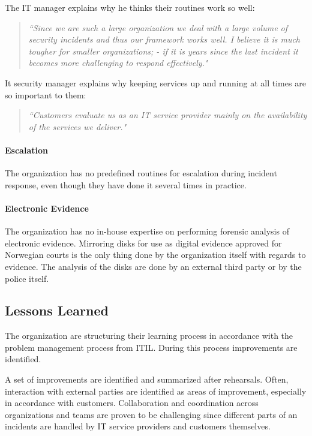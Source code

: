 The IT manager explains why he thinks their routines work so well:
\begin{quote}
\textit{``Since we are such a large organization we deal with a large volume of security incidents and thus our framework works well. I believe it is much tougher for smaller organizations; - if it is years since the last incident it becomes more challenging to respond effectively."}
\end{quote}

It security manager explains why keeping services up and running at all times are so important to them:
\begin{quote}
\textit{``Customers evaluate us as an IT service provider mainly on the availability of the services we deliver."}
\end{quote}

\paragraph{Escalation}
The organization has no predefined routines for escalation during incident response, even though they have done it several times in practice.

\paragraph{Electronic Evidence}
The organization has no in-house expertise on performing forensic analysis of electronic evidence. Mirroring disks for use as digital evidence approved for Norwegian courts is the only thing done by the organization itself with regards to evidence. The analysis of the disks are done by an external third party or by the police itself.

\subsection{Lessons Learned}
The organization are structuring their learning process in accordance with the problem management process from ITIL. During this process improvements are identified. 

A set of improvements are identified and summarized after rehearsals. Often, interaction with external parties are identified as areas of improvement, especially in accordance with customers. Collaboration and coordination across organizations and teams are proven to be challenging since different parts of an incidents are handled by IT service providers and customers themselves. 

